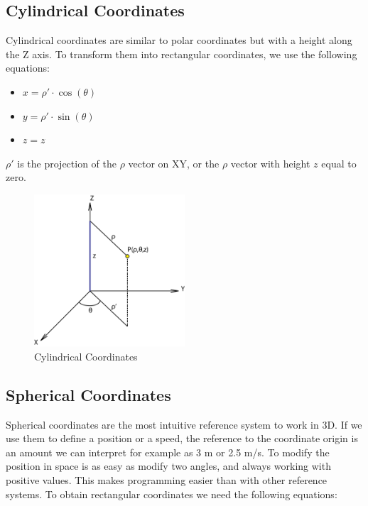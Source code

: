 \documentclass[12pt,a4paper,oneside,english]{book}
\begin{document}
\newpage

\subsection{Cylindrical Coordinates}

Cylindrical coordinates are similar to polar coordinates but with a height along the Z axis. To transform them into rectangular coordinates, we use the following equations:

\begin{itemize}
  \item $x=\rho'\cdot\cos(\theta)$
  \item $y=\rho'\cdot\sin(\theta)$
  \item $z=z$
\end{itemize}

$\rho'$ is the projection of the $\rho$ vector on XY, or the $\rho$ vector with height $z$ equal to zero.

\begin{figure}[htbp]
  \begin{center}
    \includegraphics[width=0.50\textwidth]{images/CC.png}
    \caption{Cylindrical Coordinates}
    \label{cylindrical coordinates}
  \end{center}
\end{figure}

\newpage

\subsection{Spherical Coordinates}

Spherical coordinates are the most intuitive reference system to work in 3D. If we use them to define a position or a speed, the reference to the coordinate origin is an amount we can interpret for example as 3 m or 2.5 m/s. To modify the position in space is as easy as modify two angles, and always working with positive values. This makes programming easier than with other reference systems. To obtain rectangular coordinates we need the following equations:
\end{document}
